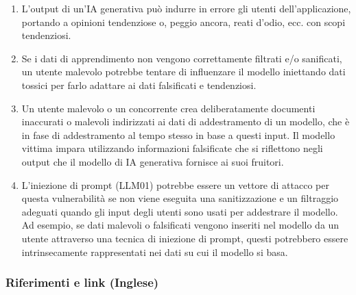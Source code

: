 \documentclass[
]{article}
\providecommand{\tightlist}{%
  \setlength{\itemsep}{0pt}\setlength{\parskip}{0pt}}
\begin{document}
\begin{enumerate}
\def\labelenumi{\arabic{enumi}.}
\tightlist
\item
  L'output di un'IA generativa può indurre in errore gli utenti
  dell'applicazione, portando a opinioni tendenziose o, peggio ancora,
  reati d'odio, ecc. con scopi tendenziosi.
\item
  Se i dati di apprendimento non vengono correttamente filtrati e/o
  sanificati, un utente malevolo potrebbe tentare di influenzare il
  modello iniettando dati tossici per farlo adattare ai dati falsificati
  e tendenziosi.
\item
  Un utente malevolo o un concorrente crea deliberatamente documenti
  inaccurati o malevoli indirizzati ai dati di addestramento di un
  modello, che è in fase di addestramento al tempo stesso in base a
  questi input. Il modello vittima impara utilizzando informazioni
  falsificate che si riflettono negli output che il modello di IA
  generativa fornisce ai suoi fruitori.
\item
  L'iniezione di prompt (LLM01) potrebbe essere un vettore di attacco
  per questa vulnerabilità se non viene eseguita una sanitizzazione e un
  filtraggio adeguati quando gli input degli utenti sono usati per
  addestrare il modello. Ad esempio, se dati malevoli o falsificati
  vengono inseriti nel modello da un utente attraverso una tecnica di
  iniezione di prompt, questi potrebbero essere intrinsecamente
  rappresentati nei dati su cui il modello si basa.
\end{enumerate}

\subsubsection{Riferimenti e link
(Inglese)}\label{riferimenti-e-link-inglese}
\end{document}
